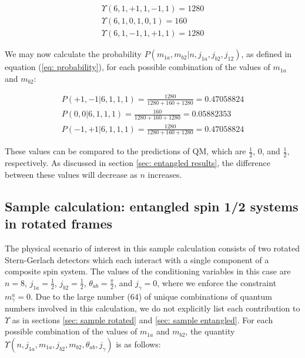 \documentclass{article}
\begin{document}
\begin{equation}
\begin{array}{ll}
    \Upsilon(6,1,+1,1,-1,1)=1280\\
    \Upsilon(6,1,0,1,0,1)=160\\
    \Upsilon(6,1,-1,1,+1,1)=1280
\end{array}
\end{equation}

We may now calculate the probability $P(m_{1a},m_{b2}|n,j_{1a},j_{b2},j_{12})$, as defined in equation (\ref{eq: probability}), for each possible combination of the values of $m_{1a}$ and $m_{b2}$:

\begin{equation}
\begin{array}{ll}
    P(+1,-1|6,1,1,1)=\frac{1280}{1280+160+1280}=0.47058824\\
    P(0,0|6,1,1,1)=\frac{160}{1280+160+1280}=0.05882353\\
    P(-1,+1|6,1,1,1)=\frac{1280}{1280+160+1280}=0.47058824
\end{array}
\end{equation}

These values can be compared to the predictions of QM, which are $\frac{1}{2}$, $0$, and $\frac{1}{2}$, respectively. As discussed in section \ref{sec: entangled results}, the difference between these values will decrease as $n$ increases. 

\subsection{Sample calculation: entangled spin 1/2 systems in rotated frames \label{sec: sample bell}}

The physical scenario of interest in this sample calculation consists of two rotated Stern-Gerlach detectors which each interact with a single component of a composite spin system. The values of the conditioning variables in this case are $n=8$, $j_{1a}=\frac{1}{2}$, $j_{b2}=\frac{1}{2}$, $\theta_{ab}=\frac{\pi}{2}$, and $j_{\gamma}=0$, where we enforce the constraint $m^a_{\gamma}=0$. Due to the large number (64) of unique combinations of quantum numbers involved in this calculation, we do not explicitly list each contribution to $\Upsilon$ as in sections \ref{sec: sample rotated} and \ref{sec: sample entangled}. For each possible combination of the values of $m_{1a}$ and $m_{b2}$, the quantity $\Upsilon(n,j_{1a},m_{1a},j_{b2},m_{b2},\theta_{ab},j_{\gamma})$ is as follows:
\end{document}
